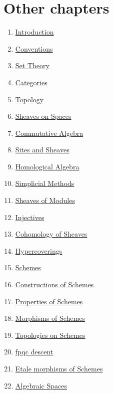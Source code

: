 \section{Other chapters}

\begin{multicols}{2}
\begin{enumerate}
\item \hyperref[introduction-section-overview]{Introduction}
\item \hyperref[conventions-section-comments]{Conventions}
\item \hyperref[sets-section-introduction]{Set Theory}
\item \hyperref[categories-section-introduction]{Categories}
\item \hyperref[topology-section-introduction]{Topology}
\item \hyperref[sheaves-section-introduction]{Sheaves on Spaces}
\item \hyperref[algebra-section-introduction]{Commutative Algebra}
\item \hyperref[sites-section-introduction]{Sites and Sheaves}
\item \hyperref[homology-section-introduction]{Homological Algebra}
\item \hyperref[simplicial-section-introduction]{Simplicial Methods}
\item \hyperref[modules-section-introduction]{Sheaves of Modules}
\item \hyperref[injectives-section-introduction]{Injectives}
\item \hyperref[cohomology-section-introduction]{Cohomology of Sheaves}
\item \hyperref[hypercovering-section-introduction]{Hypercoverings}
\item \hyperref[schemes-section-introduction]{Schemes}
\item \hyperref[constructions-section-introduction]{Constructions of Schemes}
\item \hyperref[properties-section-introduction]{Properties of Schemes}
\item \hyperref[morphisms-section-introduction]{Morphisms of Schemes}
\item \hyperref[topologies-section-introduction]{Topologies on Schemes}
\item \hyperref[fpqc-descent-section-introduction]{fpqc descent}
\item \hyperref[etale-section-introduction]{Etale morphisms of Schemes}
\item \hyperref[spaces-section-introduction]{Algebraic Spaces}

\end{enumerate}
\end{multicols}

